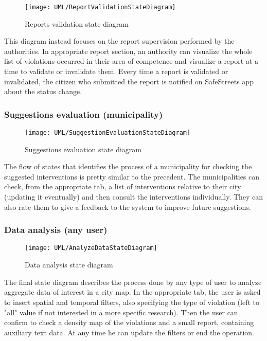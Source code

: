\begin{figure}[H]
	\centering
	\texttt{[image: UML/ReportValidationStateDiagram]}
	\caption{Reports validation state diagram}
\end{figure}

This diagram instead focuses on the report supervision performed by the authorities. In appropriate report section, an authority can visualize the whole list of violations occurred in their area of competence and visualize a report at a time to validate or invalidate them. Every time a report is validated or invalidated, the citizen who submitted the report is notified on SafeStreets app about the status change.

\subsubsection{Suggestions evaluation (municipality)}

\begin{figure}[H]
	\centering
	\texttt{[image: UML/SuggestionEvaluationStateDiagram]}
	\caption{Suggestions evaluation state diagram}
\end{figure}

The flow of states that identifies the process of a municipality for checking the suggested interventions is pretty similar to the precedent. The municipalities can check, from the appropriate tab, a list of interventions relative to their city (updating it eventually) and then consult the interventions individually. They can also rate them to give a feedback to the system to improve future suggestions.

\subsubsection{Data analysis (any user)}

\begin{figure}[H]
	\centering
	\texttt{[image: UML/AnalyzeDataStateDiagram]}
	\caption{Data analysis state diagram}
\end{figure}

The final state diagram describes the process done by any type of user to analyze aggregate data of interest in a city map. In the appropriate tab, the user is asked to insert spatial and temporal filters, also specifying the type of violation (left to "all" value if not interested in a more specific research). Then the user can confirm to check a density map of the violations and a small report, containing auxiliary text data. At any time he can update the filters or end the operation.